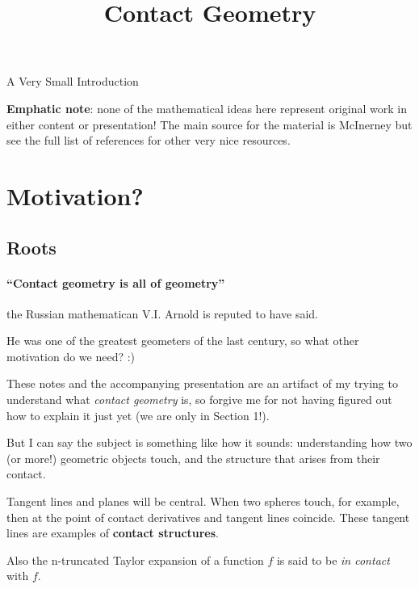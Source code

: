\documentclass{article}
\begin{document}
\title {Contact Geometry}
\maketitle

\centerline{\sc \large A Very Small Introduction }
\onehalfspace

\tableofcontents

\newpage

\textbf{Emphatic note}: none of the mathematical ideas here represent original work in
either content or presentation! The main source for the material is McInerney
\cite{mcinerney} but see the full list of references for other very nice resources.

\newpage

\section { Motivation?}

\subsection {Roots}

\paragraph{``Contact geometry is all of geometry''} the Russian mathematican
V.I. Arnold is reputed to have said.

He was one of the greatest geometers of the last century, so what other
motivation do we need? :)

These notes and the accompanying presentation are an artifact of my trying to
understand what \textsl{contact geometry} is, so forgive me for not having
figured out how to explain it just yet (we are only in Section 1!).

But I can say the subject is something like how it sounds: understanding how two
(or more!) geometric objects touch, and the structure that arises from their contact.

Tangent lines and planes will be central. When two spheres touch, for example,
then at the point of contact derivatives and tangent lines coincide. These tangent
lines are examples of \textbf{contact structures}.

Also the n-truncated Taylor expansion of a function $f$ is said to be \textsl{in
  contact} with $f$.
\end{document}
